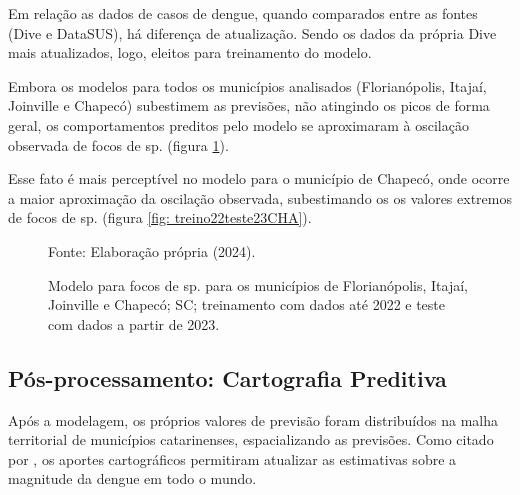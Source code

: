 \indent Em relação as dados de casos de dengue, quando comparados entre as fontes (\acrshort{Dive} e \acrshort{DataSUS}), há diferença de atualização. Sendo os dados da própria \acrshort{Dive} mais atualizados, logo, eleitos para treinamento do modelo.

\indent Embora os modelos para todos os municípios analisados (Florianópolis, Itajaí, Joinville e Chapecó) subestimem as previsões, não atingindo os picos de forma geral, os comportamentos preditos pelo modelo se aproximaram à oscilação observada de focos de  sp. (figura \ref{fig: treino22teste23}).

\indent Esse fato é mais perceptível no modelo para o município de Chapecó, onde ocorre a maior aproximação da oscilação observada, subestimando os os valores extremos de focos de  sp. (figura \ref{fig: treino22teste23CHA}).

\begin{figure}[htbp]
    \begin{center}
    \caption{Modelo  para focos de  sp. para os municípios de Florianópolis, Itajaí, Joinville e Chapecó; \acrlong{SC}; treinamento com dados até 2022 e teste com dados a partir de 2023.}
    \label{fig: treino22teste23}
    \hfill
    \hfill
    \end{center}
    \small{Fonte: Elaboração própria (2024).}
\end{figure}

\subsection{Pós-processamento: Cartografia Preditiva}

\indent Após a modelagem, os próprios valores de previsão foram distribuídos na malha territorial de municípios catarinenses, espacializando as previsões. Como citado por , os aportes cartográficos permitiram atualizar as estimativas sobre a magnitude da dengue em todo o mundo.

